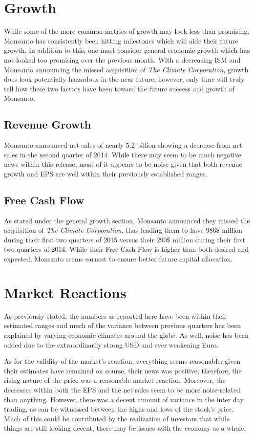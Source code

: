 \documentclass[11pt,letterpaper,english]{article}
\newcommand{\newpar}{\vspace{10mm}\noindent}
\begin{document}
\section{Growth}
While some of the more common metrics of growth may look less than promising, Monsanto has consistently been hitting milestones which will aide their future growth. In addition to this, one must consider general economic growth which has not looked too promising over the previous month. With a decreasing ISM and Monsanto announcing the missed acquisition of \textit{The Climate Corporation}, growth does look potentially hazardous in the near future; however, only time will truly tell how these two factors have been toward the future success and growth of Monsanto.

\subsection{Revenue Growth}
Monsanto announced net sales of nearly $5.2$ billion showing a decrease from net sales in the second quarter of 2014. While there may seem to be much negative news within this release, most of it appears to be noise given that both revenue growth and EPS are well within their previously established ranges. 

\subsection{Free Cash Flow}
As stated under the general growth section, Monsanto announced they missed the acquisition of \textit{The Climate Corporation}, thus leading them to have $986 \$$ million during their first two quarters of 2015 versus their $290 \$$ million during their first two quarters of 2014. While their Free Cash Flow is higher than both desired and expected, Monsanto seems earnest to ensure better future capital allocation. 

\section{Market Reactions}
As previously stated, the numbers as reported here have been within their estimated ranges and much of the variance between previous quarters has been explained by varying economic climates around the globe. As well, noise has been added due to the extraordinarily strong USD and ever weakening Euro.

\newpar
As for the validity of the market's reaction, everything seems reasonable: given their estimates have remained on course, their news was positive; therefore, the rising nature of the price was a reasonable market reaction. Moreover, the decreases within both the EPS and the net sales seem to be more noise-related than anything. However, there was a decent amount of variance in the inter day trading, as can be witnessed between the highs and lows of the stock's price. Much of this could be contributed by the realization of investors that while things are still looking decent, there may be issues with the economy as a whole.
\end{document}
